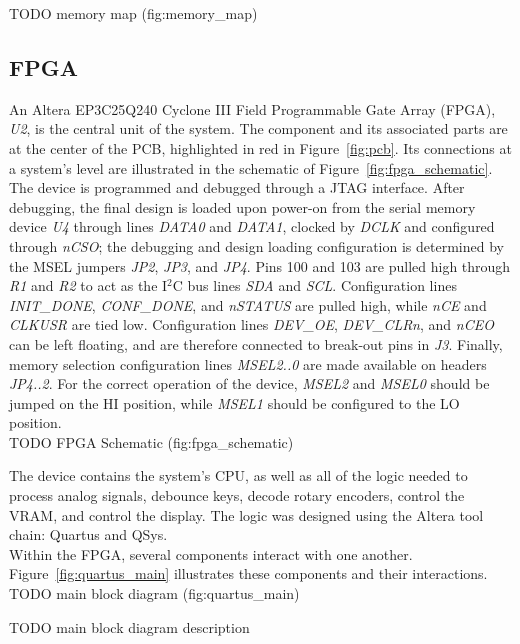 \documentclass{scrartcl}
\begin{document}
	TODO memory map (fig:memory_map)

	\subsection{FPGA}
	An Altera EP3C25Q240 Cyclone III Field Programmable Gate Array (FPGA), \textit{U2}, is the central unit of the system. The component and its associated parts are at the center of the PCB, highlighted in red in Figure~\ref{fig:pcb}. Its connections at a system's level are illustrated in the schematic of Figure~\ref{fig:fpga_schematic}. The device is programmed and debugged through a JTAG interface. After debugging, the final design is loaded upon power-on from the serial memory device \textit{U4} through lines \textit{DATA0} and \textit{DATA1}, clocked by \textit{DCLK} and configured through \textit{nCSO}; the debugging and design loading configuration is determined by the MSEL jumpers \textit{JP2}, \textit{JP3}, and \textit{JP4}. Pins 100 and 103 are pulled high through \textit{R1} and \textit{R2} to act as the I$^2$C bus lines \textit{SDA} and \textit{SCL}. Configuration lines \textit{INIT_DONE}, \textit{CONF_DONE}, and \textit{nSTATUS} are pulled high, while \textit{nCE} and \textit{CLKUSR} are tied low. Configuration lines \textit{DEV_OE}, \textit{DEV_CLRn}, and \textit{nCEO} can be left floating, and are therefore connected to break-out pins in \textit{J3}. Finally, memory selection configuration lines \textit{MSEL2..0} are made available on headers \textit{JP4..2}. For the correct operation of the device, \textit{MSEL2} and \textit{MSEL0} should be jumped on the HI position, while \textit{MSEL1} should be configured to the LO position.\\

	TODO FPGA Schematic (fig:fpga_schematic)

	The device contains the system's CPU, as well as all of the logic needed to process analog signals, debounce keys, decode rotary encoders, control the VRAM, and control the display. The logic was designed using the Altera tool chain: Quartus and QSys.\\

	Within the FPGA, several components interact with one another. Figure~\ref{fig:quartus_main} illustrates these components and their interactions.\\

	TODO main block diagram (fig:quartus_main)

	TODO main block diagram description
	
\end{document}
